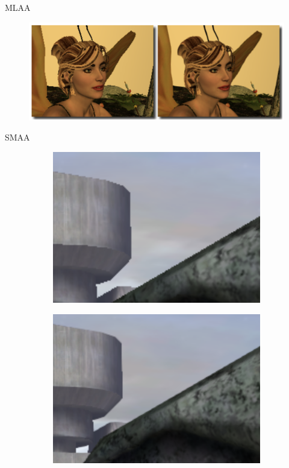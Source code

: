 \documentclass[table]{beamer}
\begin{document}
\begin{frame}[fragile]{MLAA}
    \begin{figure}
        \includegraphics[width=\linewidth]{./figures/mlaares.png}
    \end{figure}
\end{frame}

\begin{frame}[fragile]{SMAA}
    \begin{figure}[!htbp]
        \centering
        \begin{subfigure}[b]{0.45\textwidth}
            \includegraphics[width=\textwidth]{figures/smaaOFF.png}
        \end{subfigure}
        \centering
        \begin{subfigure}[b]{0.45\textwidth}
            \includegraphics[width=\textwidth]{figures/smaaON.png}

\end{subfigure}
\end{figure}
\end{frame}
\end{document}
